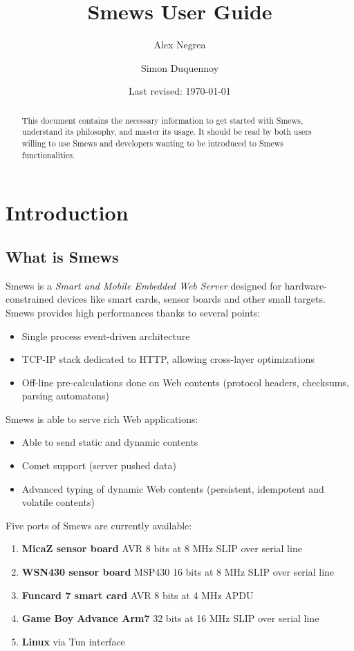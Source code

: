 \documentclass{report}
\title{Smews User Guide}
\author{Alex Negrea \and Simon Duquennoy}
\date{Last revised: \today }
\begin{document}
\maketitle

\begin{abstract}
    This document contains the necessary information to get started with
    Smews, understand its philosophy, and master its usage. It should
    be read by both users willing to use Smews and developers wanting
    to be introduced to Smews functionalities.
\end{abstract}

\tableofcontents
 
\chapter{Introduction}

\section{What is Smews}
\label{sec:about}

Smews is a \emph{Smart and Mobile Embedded Web Server} designed for hardware-constrained devices like smart cards, sensor
boards and other small targets. Smews provides high performances thanks to several points:
\begin{itemize}
 \item Single process event-driven architecture
 \item TCP-IP stack dedicated to HTTP, allowing cross-layer optimizations
 \item Off-line pre-calculations done on Web contents (protocol headers, checksums, parsing automatons) 
\end{itemize}

Smews is able to serve rich Web applications:
\begin{itemize}
 \item Able to send static and dynamic contents
 \item Comet support (server pushed data)
 \item Advanced typing of dynamic Web contents (persistent, idempotent and volatile contents)
\end{itemize}

Five ports of Smews are currently available: 
\begin{enumerate}
 \item \textbf{MicaZ sensor board} AVR 8 bits at 8 MHz SLIP over serial line
 \item \textbf{WSN430 sensor board} MSP430 16 bits at 8 MHz SLIP over serial line
 \item \textbf{Funcard 7 smart card } AVR 8 bits at 4 MHz  APDU
 \item \textbf{Game Boy Advance Arm7} 32 bits at 16 MHz SLIP over serial line
 \item \textbf{Linux} via Tun interface
\end{enumerate}
\end{document}
